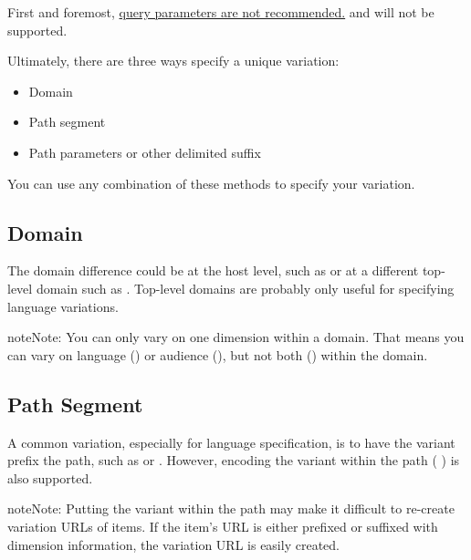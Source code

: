 \documentclass[letterpaper,10pt,english]{sphinxmanual}
\begin{document}
First and foremost, \href{http://googlewebmastercentral.blogspot.com/2010/03/working-with-multi-regional-websites.html}{query parameters are not recommended.} and will not be supported.

Ultimately, there are three ways specify a unique variation:
\begin{itemize}
\item {} 
Domain

\item {} 
Path segment

\item {} 
Path parameters or other delimited suffix

\end{itemize}

You can use any combination of these methods to specify your variation.


\subsection{Domain}
\label{variations_and_urls:domain}
The domain difference could be at the host level, such as  or at a different top-level domain such as . Top-level domains are probably only useful for specifying language variations.

\begin{notice}{note}{Note:}
You can only vary on one dimension within a domain. That means you can vary on language () or audience (), but not both () within the domain.
\end{notice}


\subsection{Path Segment}
\label{variations_and_urls:path-segment}
A common variation, especially for language specification, is to have the variant prefix the path, such as  or . However, encoding the variant within the path ( ) is also supported.

\begin{notice}{note}{Note:}
Putting the variant within the path may make it difficult to re-create variation URLs of items. If the item's URL is either prefixed or suffixed with dimension information, the variation URL is easily created.
\end{notice}
\end{document}
